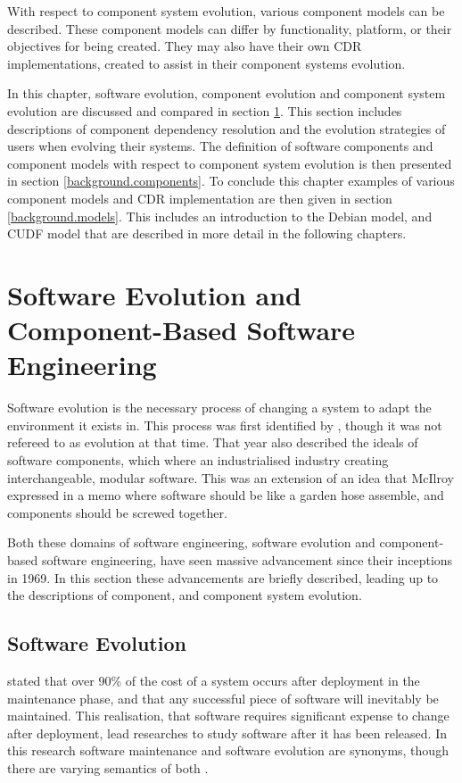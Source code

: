 With respect to component system evolution, various component models can be described.
These component models can differ by functionality, platform, or their objectives for being created.
They may also have their own CDR implementations, created to assist in their component systems evolution. 

In this chapter, software evolution, component evolution and component system evolution are discussed and compared in section \ref{background.evolution}.
This section includes descriptions of component dependency resolution and the evolution strategies of users when evolving their systems.
The definition of software components and component models with respect to component system evolution is then presented in section \ref{background.components}.
To conclude this chapter  examples of various component models and CDR implementation are then given in section \ref{background.models}.
This includes an introduction to the Debian model, and CUDF model that are described in more detail in the following chapters.

\section{Software Evolution and Component-Based Software Engineering}
\label{background.evolution}
Software evolution
is the necessary process of changing a system to adapt the environment it exists in.
This process was first identified by \cite{Lehman1969}, though it was not refereed to as evolution at that time.
That year \cite{McIlroy1969} also described the ideals of software components, which where an industrialised industry creating interchangeable, modular software.
This was an extension of an idea that McIlroy expressed in a memo \citep{mcilroy1964pipes} where software should be like a garden hose assemble, and components should be screwed together.

Both these domains of software engineering, software evolution and component-based software engineering, have seen massive advancement since their inceptions in 1969.
In this section these advancements are briefly described, leading up to the descriptions of component, and component system evolution.

\subsection{Software Evolution}
\cite{Brooks1975} stated that over 90\% of the cost of a system occurs after deployment in the maintenance phase,
and that any successful piece of software will inevitably be maintained.
This realisation, that software requires significant expense to change after deployment, lead researches to study software after it has been released.
In this research software maintenance and software evolution are synonyms, though there are varying semantics of both \citep{Lehman2006,Godfrey2008}.

